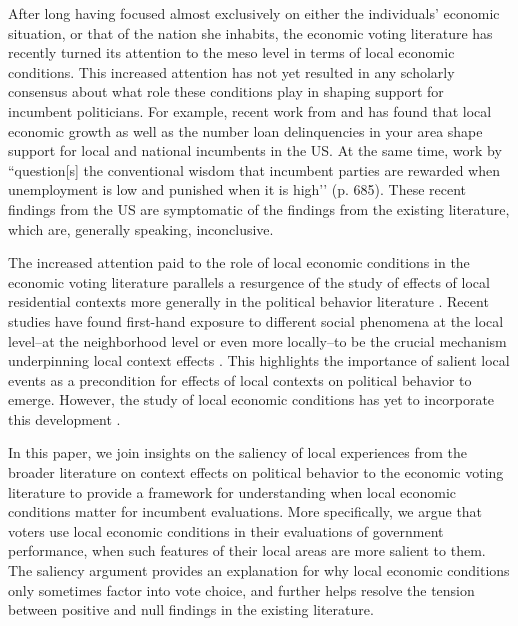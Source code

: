 \documentclass[12pt,a4paper]{article}
\begin{document}
	After long having focused almost exclusively on either the individuals’ economic situation, or that of the nation she inhabits, the economic voting literature has recently turned its attention to the meso level in terms of local economic conditions. This increased attention has not yet resulted in any scholarly consensus about what role these conditions play in shaping support for incumbent politicians. For example, recent work from \cite{warshaw2017economic} and \cite{healy2017presidential} has found that local economic growth as well as the number loan delinquencies in your area shape support for local and national incumbents in the US. At the same time, work by \cite{wright2012unemployment} ``question[s] the conventional wisdom that incumbent parties are rewarded when unemployment is low and punished when it is high’’ (p. 685). These recent findings from the US are symptomatic of the findings from the existing literature, which are, generally speaking, inconclusive.
	
	The increased attention paid to the role of local economic conditions in the economic voting literature parallels a resurgence of the study of effects of local residential contexts more generally in the political behavior literature \cite[e.g.,][]{hopkins2010politicized,enos2016demolition}. Recent studies have found first-hand exposure to different social phenomena at the local level--at the neighborhood level or even more locally--to be the crucial mechanism underpinning local context effects \citep{moore2017defining,dinesen2015ethnic,enos2016demolition,hjorth2017influence}. This highlights the importance of salient local events as a precondition for effects of local contexts on political behavior to emerge. However, the study of local economic conditions has yet to incorporate this development \citep[though see][]{bisgaard2016reconsidering,reeves2012ecologies}.
	
	In this paper, we join insights on the saliency of local experiences from the broader literature on context effects on political behavior to the economic voting literature to provide a framework for understanding when local economic conditions matter for incumbent evaluations. More specifically, we argue that voters use local economic conditions in their evaluations of government performance, when such features of their local areas are more salient to them. The saliency argument provides an explanation for why local economic conditions only sometimes factor into vote choice, and further helps resolve the tension between positive and null findings in the existing literature.
	
\end{document}
